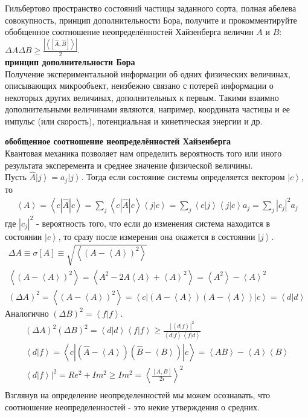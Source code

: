 \documentclass[__main__.tex]{subfiles}
\begin{document}
Гильбертово пространство состояний частицы заданного сорта, полная абелева совокупность, принцип дополнительности Бора, получите и прокомментируйте обобщенное соотношение неопределённостей Хайзенберга величин $A$ и $B$: $\Delta{A}\Delta{B}\ge\frac{\left|\left<\left[\hat{A},\hat{B}\right]\right>\right|}{2}$.\\ 

\textbf{принцип дополнительности Бора}\\
Получение экспериментальной информации об одних физических величинах, описывающих микрообъект, неизбежно связано с потерей информации о некоторых других величинах, дополнительных к первым. Такими взаимно дополнительными величинами являются, например, координата частицы и ее импульс (или скорость), потенциальная и кинетическая энергии и др.

\textbf{обобщенное соотношение неопределённостей Хайзенберга}\\
Квантовая механика позволяет нам определить вероятность того или иного результата эксперемента и среднее значение физической величины.\\
Пусть $\hat{A}\left|j\right> = a_j \left|j\right>$. Тогда если состояние системы определяется вектором $\left|c\right>$, то\\
\begin{gather}
    \left<A\right> = \left<c|\hat{A}|c\right> = \sum_j \left<c|\hat{A}|c\right>\left<j|c\right> = \sum_j \left<c|j\right>\left<j|c\right>a_j = \sum_j |c_j|^2 a_j
\end{gather}
где $|c_j|^2$ - вероятность того, что если до изменения система находится в состоянии $\left|c\right>$, то сразу после измерения она окажется в состоянии $\left|j\right>$.\\
\begin{gather}
\Delta A \equiv \sigma[A] \equiv \sqrt{\left<(A-\left<A\right>)^2\right>}\\
\left<(A-\left<A\right>)^2\right> = \left<A^2-2A\left<A\right>+\left<A\right>^2\right> = \left<A^2\right> - \left<A\right>^2\\
(\Delta A)^2 = \left<(A-\left<A\right>)^2\right> = \left< c|(A-\left<A\right>)(A-\left<A\right>)|c\right> = \left<d|d\right>
\end{gather}
Аналогично $(\Delta B)^2 = \left<f|f\right>$.\\
\begin{gather}
(\Delta A)^2(\Delta B)^2 = \left<d|d\right>\left<f|f\right> \geq \frac{|\left<d|f\right>|^2}{\left<d|f\right>\left<f|d\right>}\\
\left<d|f\right> = \left<c|(\hat{A}-\left<A\right>)(\hat{B} - \left<B\right>)|c\right> = \left<AB\right> - \left< A\right> \left< B\right>\\
\left<d|f\right>|^2 = Re^2+Im^2 \geq Im^2 = \left<\frac{[A,B]}{2i}\right>^2\\
\end{gather}
Взглянув на определение неопределенностей мы можем осознавать, что соотношение неопределенностей - это некие утверждения о средних.\\
\end{document}
